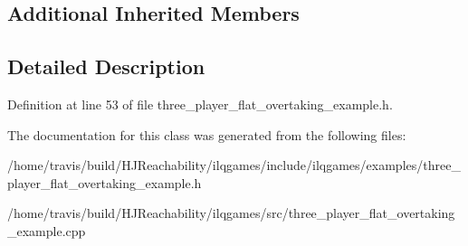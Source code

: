 \subsection*{Additional Inherited Members}


\subsection{Detailed Description}


Definition at line 53 of file three\+\_\+player\+\_\+flat\+\_\+overtaking\+\_\+example.\+h.



The documentation for this class was generated from the following files\+:\begin{DoxyCompactItemize}
\item 
/home/travis/build/\+H\+J\+Reachability/ilqgames/include/ilqgames/examples/three\+\_\+player\+\_\+flat\+\_\+overtaking\+\_\+example.\+h\item 
/home/travis/build/\+H\+J\+Reachability/ilqgames/src/three\+\_\+player\+\_\+flat\+\_\+overtaking\+\_\+example.\+cpp\end{DoxyCompactItemize}
